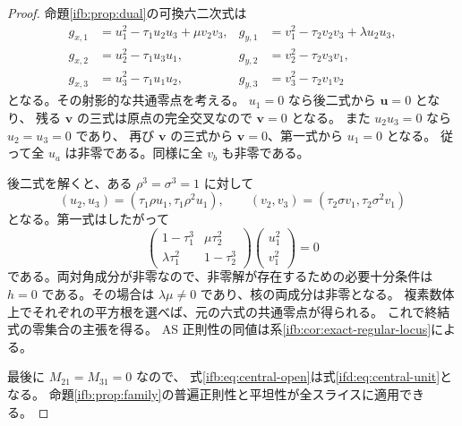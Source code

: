 \begin{proof}
命題\ref{ifb:prop:dual}の可換六二次式は
\begin{align*}
 g_{x,1}&=u_1^2-\tau_1u_2u_3+\mu v_2v_3,&
 g_{y,1}&=v_1^2-\tau_2v_2v_3+\lambda u_2u_3,\\
 g_{x,2}&=u_2^2-\tau_1u_3u_1,&
 g_{y,2}&=v_2^2-\tau_2v_3v_1,\\
 g_{x,3}&=u_3^2-\tau_1u_1u_2,&
 g_{y,3}&=v_3^2-\tau_2v_1v_2
\end{align*}
となる。その射影的な共通零点を考える。
$u_1=0$ なら後二式から $\mathbf u=0$ となり、
残る $\mathbf v$ の三式は原点の完全交叉なので $\mathbf v=0$ となる。
また $u_2u_3=0$ なら $u_2=u_3=0$ であり、
再び $\mathbf v$ の三式から $\mathbf v=0$、第一式から $u_1=0$ となる。
従って全 $u_a$ は非零である。同様に全 $v_b$ も非零である。

後二式を解くと、ある $\rho^3=\sigma^3=1$ に対して
\[
 (u_2,u_3)=(\tau_1\rho u_1,\tau_1\rho^2u_1),\qquad
 (v_2,v_3)=(\tau_2\sigma v_1,\tau_2\sigma^2v_1)
\]
となる。第一式はしたがって
\begin{equation}\label{ifd:eq:two-square-equations}
 \begin{pmatrix}
  1-\tau_1^3&\mu\tau_2^2\\
  \lambda\tau_1^2&1-\tau_2^3
 \end{pmatrix}
 \begin{pmatrix}u_1^2\\v_1^2\end{pmatrix}=0
\end{equation}
である。両対角成分が非零なので、非零解が存在するための必要十分条件は
$h=0$ である。その場合は $\lambda\mu\ne0$ であり、核の両成分は非零となる。
複素数体上でそれぞれの平方根を選べば、元の六式の共通零点が得られる。
これで終結式の零集合の主張を得る。
AS 正則性の同値は系\ref{ifb:cor:exact-regular-locus}による。

最後に $M_{21}=M_{31}=0$ なので、
式\eqref{ifb:eq:central-open}は式\eqref{ifd:eq:central-unit}となる。
命題\ref{ifb:prop:family}の普遍正則性と平坦性が全スライスに適用できる。
\end{proof}

